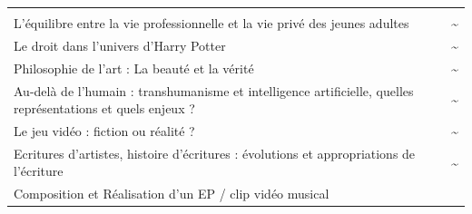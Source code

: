 \documentclass[
  10pt,
  french,
  a5paper,
  openany]{book}
\begin{document}
\begin{longtable}[]{@{}lc@{}}
\begin{minipage}[t]{0.06\columnwidth}
\end{minipage}\tabularnewline
\begin{minipage}[t]{0.88\columnwidth}\raggedright
L'équilibre entre la vie professionnelle et la vie privé des jeunes adultes\strut
\end{minipage} & \begin{minipage}[t]{0.06\columnwidth}\centering
\textasciitilde{}\strut
\end{minipage}\tabularnewline
\begin{minipage}[t]{0.88\columnwidth}\raggedright
Le droit dans l'univers d'Harry Potter\strut
\end{minipage} & \begin{minipage}[t]{0.06\columnwidth}\centering
\textasciitilde{}\strut
\end{minipage}\tabularnewline
\begin{minipage}[t]{0.88\columnwidth}\raggedright
Philosophie de l'art : La beauté et la vérité\strut
\end{minipage} & \begin{minipage}[t]{0.06\columnwidth}\centering
\textasciitilde{}\strut
\end{minipage}\tabularnewline
\begin{minipage}[t]{0.88\columnwidth}\raggedright
Au-delà de l'humain : transhumanisme et intelligence artificielle, quelles représentations et quels enjeux ?\strut
\end{minipage} & \begin{minipage}[t]{0.06\columnwidth}\centering
\textasciitilde{}\strut
\end{minipage}\tabularnewline
\begin{minipage}[t]{0.88\columnwidth}\raggedright
Le jeu vidéo : fiction ou réalité ?\strut
\end{minipage} & \begin{minipage}[t]{0.06\columnwidth}\centering
\textasciitilde{}\strut
\end{minipage}\tabularnewline
\begin{minipage}[t]{0.88\columnwidth}\raggedright
Ecritures d'artistes, histoire d'écritures : évolutions et appropriations de l'écriture\strut
\end{minipage} & \begin{minipage}[t]{0.06\columnwidth}\centering
\textasciitilde{}\strut
\end{minipage}\tabularnewline
\begin{minipage}[t]{0.88\columnwidth}\raggedright
Composition et Réalisation d'un EP / clip vidéo musical\strut

\end{minipage}
\end{longtable}
\end{document}
